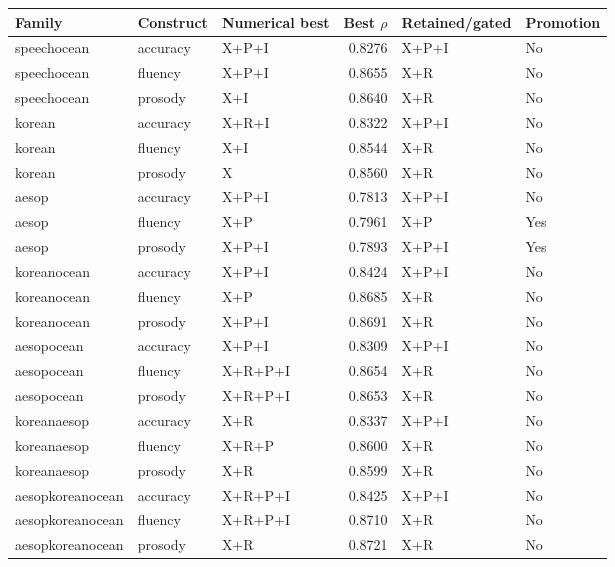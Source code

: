 \documentclass[10pt]{article}
\begin{document}
\begin{longtable}{@{}lllrll@{}}
\toprule Family & Construct & Numerical best & Best $\rho$ & Retained/gated & Promotion\\\midrule\endhead
speechocean & accuracy & X+P+I & 0.8276 & X+P+I & No \\
speechocean & fluency & X+P+I & 0.8655 & X+R & No \\
speechocean & prosody & X+I & 0.8640 & X+R & No \\
korean & accuracy & X+R+I & 0.8322 & X+P+I & No \\
korean & fluency & X+I & 0.8544 & X+R & No \\
korean & prosody & X & 0.8560 & X+R & No \\
aesop & accuracy & X+P+I & 0.7813 & X+P+I & No \\
aesop & fluency & X+P & 0.7961 & X+P & Yes \\
aesop & prosody & X+P+I & 0.7893 & X+P+I & Yes \\
koreanocean & accuracy & X+P+I & 0.8424 & X+P+I & No \\
koreanocean & fluency & X+P & 0.8685 & X+R & No \\
koreanocean & prosody & X+P+I & 0.8691 & X+R & No \\
aesopocean & accuracy & X+P+I & 0.8309 & X+P+I & No \\
aesopocean & fluency & X+R+P+I & 0.8654 & X+R & No \\
aesopocean & prosody & X+R+P+I & 0.8653 & X+R & No \\
koreanaesop & accuracy & X+R & 0.8337 & X+P+I & No \\
koreanaesop & fluency & X+R+P & 0.8600 & X+R & No \\
koreanaesop & prosody & X+R & 0.8599 & X+R & No \\
aesopkoreanocean & accuracy & X+R+P+I & 0.8425 & X+P+I & No \\
aesopkoreanocean & fluency & X+R+P+I & 0.8710 & X+R & No \\
aesopkoreanocean & prosody & X+R & 0.8721 & X+R & No \\
\bottomrule\end{longtable}
\clearpage
\end{document}
